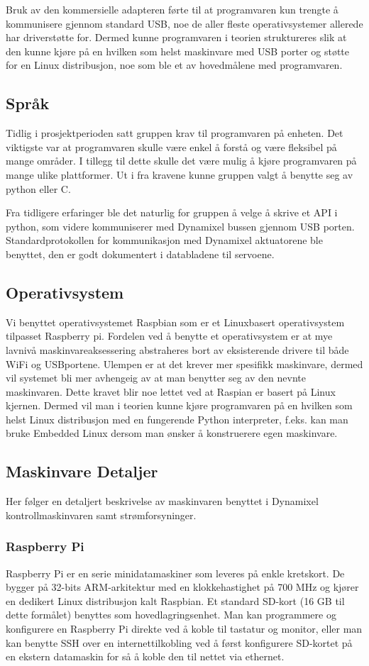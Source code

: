 \documentclass[12pt]{report}
\begin{document}
Bruk av den kommersielle adapteren førte til at programvaren kun trengte å kommunisere gjennom standard USB, noe de aller fleste operativsystemer allerede har driverstøtte for. Dermed kunne programvaren i teorien struktureres slik at den kunne kjøre på en hvilken som helst maskinvare med USB porter og støtte for en Linux distribusjon, noe som ble et av hovedmålene med programvaren.

\subsection{Språk}
Tidlig i prosjektperioden satt gruppen krav til programvaren på enheten. Det viktigste var at programvaren skulle være enkel å forstå og være fleksibel på mange områder. I tillegg til dette skulle det være mulig å kjøre programvaren på mange ulike plattformer. Ut i fra kravene kunne gruppen valgt å benytte seg av python eller C. 

Fra tidligere erfaringer ble det naturlig for gruppen å velge å skrive et API i python, som videre kommuniserer med Dynamixel bussen gjennom USB porten. Standardprotokollen for kommunikasjon med Dynamixel aktuatorene ble benyttet, den er godt dokumentert i databladene til servoene\cite{Dynamixel}. 

\subsection{Operativsystem}
Vi benyttet operativsystemet Raspbian som er et Linuxbasert operativsystem tilpasset Raspberry pi. Fordelen ved å benytte et operativsystem er at mye lavnivå maskinvareaksessering abstraheres bort av eksisterende drivere til både WiFi og USBportene. Ulempen er at det krever mer spesifikk maskinvare, dermed vil systemet bli mer avhengeig av at man benytter seg av den nevnte maskinvaren. Dette kravet blir noe lettet ved at Raspian er basert på Linux kjernen. Dermed vil man i teorien kunne kjøre programvaren på en hvilken som helst Linux distribusjon med en fungerende Python interpreter, f.eks. kan man bruke Embedded Linux dersom man ønsker å konstruerere egen maskinvare.

\subsection{Maskinvare Detaljer}
Her følger en detaljert beskrivelse av maskinvaren benyttet i Dynamixel kontrollmaskinvaren samt strømforsyninger.

\subsubsection{Raspberry Pi}Raspberry Pi er en serie minidatamaskiner som leveres på enkle kretskort. De bygger på 32-bits ARM-arkitektur med en klokkehastighet på 700 MHz og kjører en dedikert Linux distribusjon kalt Raspbian. Et standard SD-kort (16 GB til dette formålet) benyttes som hovedlagringsenhet. Man kan programmere og konfigurere en Raspberry Pi direkte ved å koble til tastatur og monitor, eller man kan benytte SSH over en internettilkobling ved å først konfigurere SD-kortet på en ekstern datamaskin for så å koble den til nettet via ethernet.
\end{document}
